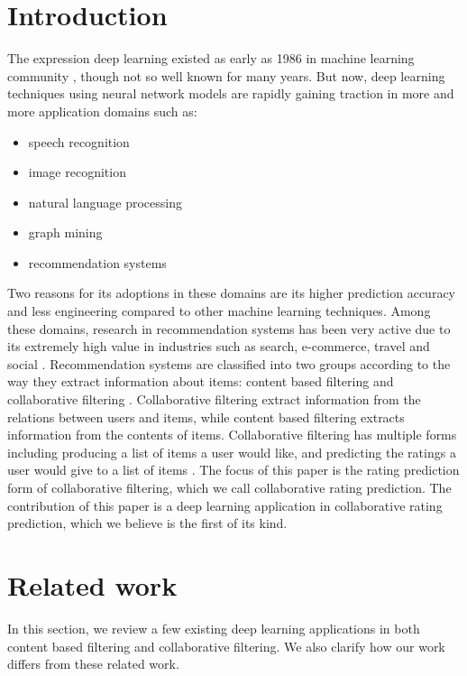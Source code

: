 \documentclass[letterpaper]{article}
\begin{document}
\section{Introduction}
The expression deep learning existed as early as 1986 in machine learning 
community \cite{dechter1986learning}, though not so well known for many years.
But now, deep learning techniques using neural network models are rapidly 
gaining traction in more and more application domains 
such as:
\begin{itemize}
	\item speech recognition \cite{hannun2014deep}
	\item image recognition \cite{simonyan2014very}
	\item natural language processing \cite{yao2013recurrent}
	\item graph mining \cite{grovernode2vec}
	\item recommendation systems \cite{barkan2016item2vec}
\end{itemize}
Two reasons for its adoptions in these domains are its higher prediction 
accuracy and less engineering compared to other machine learning techniques.
Among these domains, research in recommendation systems has been very active  
due to its extremely high value in industries such as search, e-commerce, 
travel and social \cite{buettner2016predicting}.
Recommendation systems are classified into two groups according to the way they 
extract information about items: content based filtering and collaborative 
filtering \cite{ricci2011introduction}.
Collaborative filtering extract information from the relations between users 
and items, while content based filtering extracts information from the contents 
of items.
Collaborative filtering has multiple forms including producing a list of items 
a user would like, and predicting the ratings a user would give to a list of 
items \cite{su2009survey}.
The focus of this paper is the rating prediction form of collaborative 
filtering, which we call collaborative rating prediction.
The contribution of this paper is a deep learning application in 
collaborative rating prediction, which we believe is the first of its kind.

\section{Related work}
In this section,
we review a few existing deep learning applications in both content based 
filtering and collaborative filtering.
We also clarify how our work differs from these related work.
\end{document}
